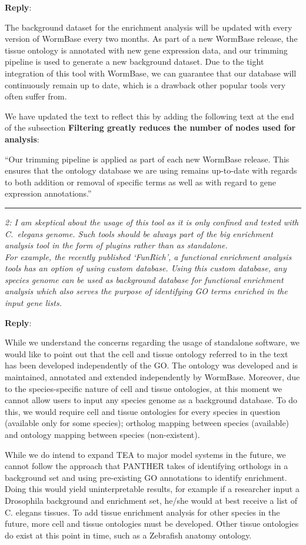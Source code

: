 \documentclass[12pt]{article}
\newcommand{\pointRaised}[2]{\medskip \hrule \noindent 
                \textsl{{\fontseries{b} #1}: #2}}
\newcommand{\reply}{\noindent \textbf{Reply}:\ }
\begin{document}
\reply{The background dataset for the enrichment analysis will be updated with every version of WormBase every two months. As part of a new WormBase release, the tissue ontology is annotated with new gene expression data, and our trimming pipeline is used to generate a new background dataset. Due to the tight integration of this tool with WormBase, we can guarantee that our database will continuously remain up to date, which is a drawback other popular tools very often suffer from. 

We have updated the text to reflect this by adding the following text at the end of the subsection \textbf{Filtering greatly reduces the number of nodes used for analysis}:

``Our trimming pipeline is applied as part of each new WormBase release. This ensures that the ontology database we are using remains up-to-date with regards to both addition or removal of specific terms as well as with regard to gene expression annotations.''

}

\pointRaised{2}{I am skeptical about the usage of this tool as it is only confined and tested with \emph{C.~elegans} genome. Such tools should be always part of the big enrichment analysis tool in the form of plugins rather than as standalone.\\
For example, the recently published `FunRich', a functional enrichment analysis tools has an option of using custom database. Using this custom database, any species genome can be used as background database for functional enrichment analysis which also serves the purpose of identifying GO terms enriched in the input gene lists. 
}

\reply{While we understand the concerns regarding the usage of standalone software, we would like to point out that the cell and tissue ontology referred to in the text has been developed independently of the GO. The ontology was developed and is maintained, annotated and extended independently by WormBase. Moreover, due to the species-specific nature of cell and tissue ontologies, at this moment we cannot allow users to input any species genome as a background database. To do this, we would require cell and tissue ontologies for every species in question (available only for some species); ortholog mapping between species (available) and ontology mapping between species (non-existent).

While we do intend to expand TEA to major model systems in the future, we cannot follow the approach that PANTHER takes of identifying orthologs in a background set and using pre-existing GO annotations to identify enrichment. Doing this would yield uninterpretable results, for example if a researcher input a Drosophila background and enrichment set, he/she would at best receive a list of C. elegans tissues. To add tissue enrichment analysis for other species in the future, more cell and tissue ontologies must be developed. Other tissue ontologies do exist at this point in time, such as a Zebrafish anatomy ontology.
}
\end{document}

